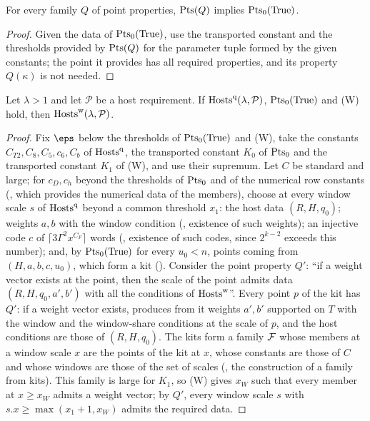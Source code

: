 \begin{lemma}\label{pf:stageU:objc}
For every family $Q$ of point properties, $\mathrm{Pts}(Q)$ implies $\mathrm{Pts}_0(\mathrm{True})$.
\end{lemma}

\begin{proof}
Given the data of $\mathrm{Pts}_0(\mathrm{True})$, use the transported constant and the thresholds provided by $\mathrm{Pts}(Q)$ for
the parameter tuple formed by the given constants; the point it provides has all required properties, and its property
$Q(\kappa)$ is not needed.
\end{proof}

\begin{lemma}\label{pf:stageU:hostww}
Let $\lambda>1$ and let $\mathcal P$ be a host requirement. If $\mathrm{Hosts}^{\mathrm q}(\lambda,\mathcal P)$,
$\mathrm{Pts}_0(\mathrm{True})$ and \textup{(W)} hold, then $\mathrm{Hosts}^{\mathrm w}(\lambda,\mathcal P)$.
\end{lemma}

\begin{proof}
Fix $\eps$ below the thresholds of $\mathrm{Pts}_0(\mathrm{True})$ and (W), take the constants $C_{T2},C_8,C_5,c_6,C_b$ of
$\mathrm{Hosts}^{\mathrm q}$, the transported constant $K_0$ of $\mathrm{Pts}_0$ and the transported constant $K_1$ of (W), and use
their supremum. Let $C$ be standard and large; for $c_D,c_h$ beyond the thresholds of $\mathrm{Pts}_0$ and of the numerical
row constants (, which provides the numerical data of the members), choose at every
window scale $s$ of $\mathrm{Hosts}^{\mathrm q}$ beyond a common threshold $x_1$: the host data $(R,H,q_0)$; weights $a,b$ with
the window condition (, existence of such weights); an injective code
$c$ of $\lceil3\Gamma^2x^{C_F}\rceil$ words (, existence of such codes,
since $2^{k-2}$ exceeds this number); and, by $\mathrm{Pts}_0(\mathrm{True})$ for every $u_0<n$, points coming from
$(H,a,b,c,u_0)$, which form a kit (). Consider the point property $Q'$: ``if a
weight vector exists at the point, then the scale of the point admits data $(R,H,q_0,a',b')$ with all the conditions of
$\mathrm{Hosts}^{\mathrm w}$''. Every point $p$ of the kit has $Q'$: if a weight vector exists,
 produces from it weights $a',b'$ supported on $T$ with
the window and the window-share conditions at the scale of $p$, and the host conditions are those of $(R,H,q_0)$. The
kits form a family $\mathcal{F}$ whose members at a window scale $x$ are the points of the kit at $x$, whose constants are
those of $C$ and whose windows are those of the set of scales (, the
construction of a family from kits). This family is large for $K_1$, so (W) gives $x_W$ such that every member at
$x\ge x_W$ admits a weight vector; by $Q'$, every window scale $s$ with $s.x\ge\max(x_1+1,x_W)$ admits the required data.
\end{proof}

